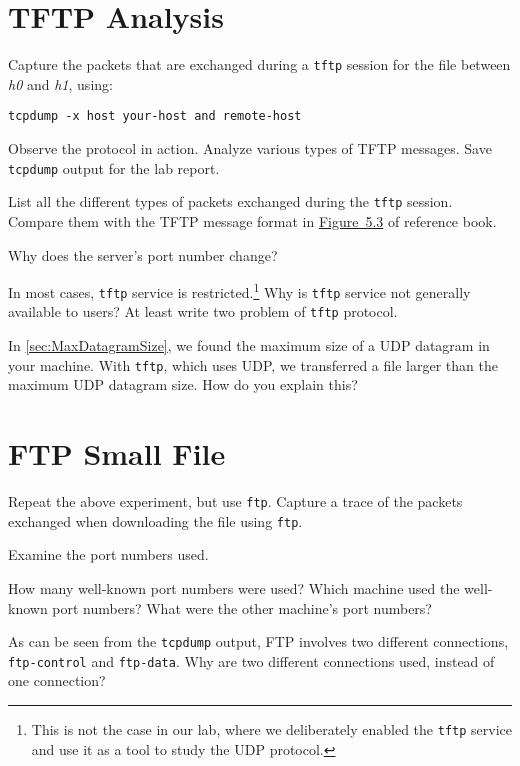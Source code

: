 \documentclass{../UTNetLab}
\begin{document}
\section{TFTP Analysis}
    Capture the packets that are exchanged during a \lstinline{tftp} session for the  file between \textit{h0} and \textit{h1}, using:
    \begin{lstlisting}[emph={your-host, remote-host},morekeywords={[3]host,and}]
tcpdump -x host your-host and remote-host
    \end{lstlisting}
    Observe the protocol in action.
    Analyze various types of TFTP messages.
    Save \lstinline{tcpdump} output for the lab report.
    
    \begin{report}
        \item List all the different types of packets exchanged during the \lstinline{tftp} session.
            Compare them with the TFTP message format in \hyperref[fig:5.3]{Figure~5.3} of reference book.

            Why does the server’s port number change?
        
        \item In most cases, \lstinline{tftp} service is restricted.\footnote{This is not the case in our lab, where we deliberately enabled the \lstinline{tftp} service and use it as a tool to study the UDP protocol.}
        Why is \lstinline{tftp} service not generally available to users? At least write two problem of \lstinline{tftp} protocol.
        
        \item In \autoref{sec:MaxDatagramSize}, we found the maximum size of a UDP datagram in your machine.
    With \lstinline{tftp}, which uses UDP, we transferred a file larger than the maximum UDP datagram size.
        How do you explain this?
    \end{report}

\section{FTP Small File}
    Repeat the above experiment, but use \lstinline{ftp}.
    Capture a trace of the packets exchanged when downloading the  file using \lstinline{ftp}.

    Examine the port numbers used.
    
    \begin{report}
        \item How many well-known port numbers were used?
        Which machine used the well-known port numbers?
        What were the other machine’s port numbers?
        
        \item As can be seen from the \lstinline{tcpdump} output, FTP involves two different connections, \texttt{ftp-control} and \texttt{ftp-data}.
        Why are two different connections used, instead of one connection?
    \end{report}
\end{document}
